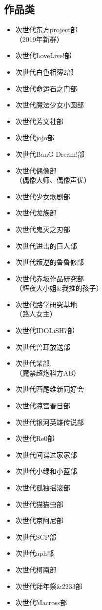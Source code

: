 \documentclass[twoside,12pt]{book}
\newenvironment{categorysection}[1]{
  \subsection*{\textcolor{truepurple}{#1}}
  \begin{itemize}[leftmargin=*, 
                 nosep,               %
                 itemsep=2pt,         %
                 parsep=0pt,          %
                 before=\setlength{\baselineskip}{23pt} %
  ]
}{
  \end{itemize}
}
\begin{document}
\begin{multicols}{3}
    \begin{categorysection}{作品类}
        \item 次世代东方project部\\（2019年新群）
        \item 次世代LoveLive!部
        \item 次世代白色相簿2部
        \item 次世代命运石之门部
        \item 次世代魔法少女小圆部
        \item 次世代芳文社部
        \item 次世代jojo部
        \item 次世代BanG Dream!部
        \item 次世代偶像部\\（偶像大师、偶像声优）
        \item 次世代少女歌剧部
        \item 次世代龙族部
        \item 次世代鬼灭之刃部
        \item 次世代进击的巨人部
        \item 次世代叛逆的鲁鲁修部
        \item 次世代赤坂作品研究部\\（辉夜大小姐\&我推的孩子）
        \item 次世代路学研究基地\\（路人女主）
        \item 次世代IDOLiSH7部
        \item 次世代兽耳放送部
        \item 次世代某部\\（魔禁超炮科方AB）
        \item 次世代西尾维新同好会
        \item 次世代凉宫春日部
        \item 次世代银河英雄传说部
        \item 次世代Re0部
        \item 次世代间谍过家家部
        \item 次世代小绿和小蓝部
        \item 次世代孤独摇滚部
        \item 次世代猫猫虫部
        \item 次世代京阿尼部
        \item 次世代SCP部
        \item 次世代aph部
        \item 次世代柯南部
        \item 次世代拜年祭\&2233部
        \item 次世代Macross部
    \end{categorysection}


\end{multicols}
\end{document}
